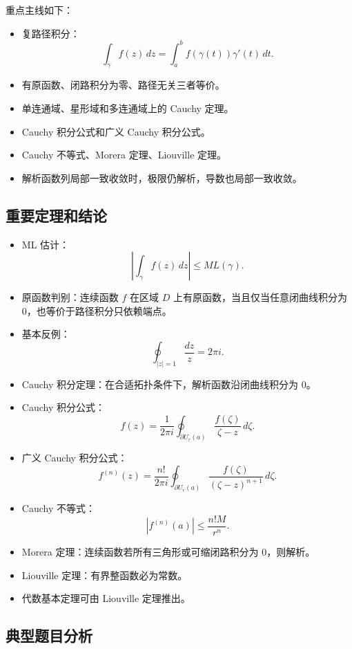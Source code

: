 \documentclass{article}
\begin{document}
重点主线如下：

\begin{itemize}
\item
  复路径积分： \[
  \int_\gamma f(z)\,dz=\int_a^b f(\gamma(t))\gamma'(t)\,dt.
  \]
\item
  有原函数、闭路积分为零、路径无关三者等价。
\item
  单连通域、星形域和多连通域上的 Cauchy 定理。
\item
  Cauchy 积分公式和广义 Cauchy 积分公式。
\item
  Cauchy 不等式、Morera 定理、Liouville 定理。
\item
  解析函数列局部一致收敛时，极限仍解析，导数也局部一致收敛。
\end{itemize}

\subsection{重要定理和结论}

\begin{itemize}
\item
  ML 估计： \[
  \left|\int_\gamma f(z)\,dz\right|\le M L(\gamma).
  \]
\item
  原函数判别：连续函数 $f$ 在区域 $D$
  上有原函数，当且仅当任意闭曲线积分为
  $0$，也等价于路径积分只依赖端点。
\item
  基本反例： \[
  \oint_{|z|=1}\frac{dz}{z}=2\pi i.
  \]
\item
  Cauchy 积分定理：在合适拓扑条件下，解析函数沿闭曲线积分为 $0$。
\item
  Cauchy 积分公式： \[
  f(z)=\frac{1}{2\pi i}\oint_{\partial U_r(a)}
  \frac{f(\zeta)}{\zeta-z}\,d\zeta.
  \]
\item
  广义 Cauchy 积分公式： \[
  f^{(n)}(z)=\frac{n!}{2\pi i}\oint_{\partial U_r(a)}
  \frac{f(\zeta)}{(\zeta-z)^{n+1}}\,d\zeta.
  \]
\item
  Cauchy 不等式： \[
  |f^{(n)}(a)|\le \frac{n!M}{r^n}.
  \]
\item
  Morera 定理：连续函数若所有三角形或可缩闭路积分为 $0$，则解析。
\item
  Liouville 定理：有界整函数必为常数。
\item
  代数基本定理可由 Liouville 定理推出。
\end{itemize}

\subsection{典型题目分析}
\end{document}
